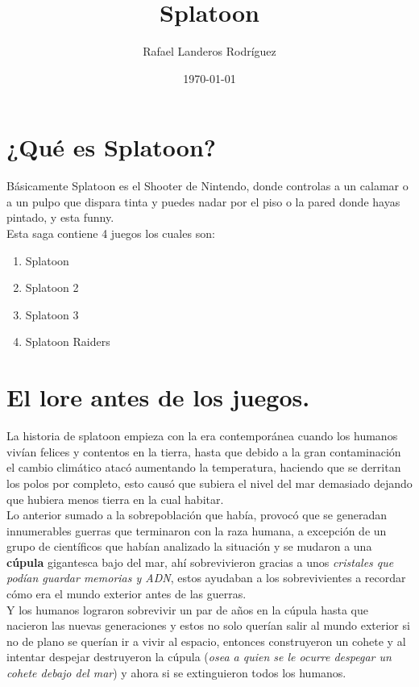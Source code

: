 \documentclass{article}
\title{Splatoon}
\author{Rafael Landeros Rodríguez}
\date{\today}
\begin{document}
\maketitle

\section{¿Qué es Splatoon?}

Básicamente Splatoon es el Shooter de Nintendo, donde controlas a un calamar o a un pulpo que dispara tinta y puedes nadar por el piso o la pared donde hayas pintado, y esta funny.\\

Esta saga contiene 4 juegos los cuales son:

\begin{enumerate}
    \item Splatoon
    \item Splatoon 2
    \item Splatoon 3
    \item Splatoon Raiders
\end{enumerate}

 \section{El lore antes de los juegos.}

La historia de splatoon empieza con la era contemporánea cuando los humanos vivían felices y contentos en la tierra, hasta que debido a la gran contaminación el cambio climático atacó aumentando la temperatura, haciendo que se derritan los polos por completo, esto causó que subiera el nivel del mar demasiado dejando que hubiera menos tierra en la cual habitar. \\

Lo anterior sumado a la sobrepoblación que había, provocó que se generadan innumerables guerras que terminaron con la raza humana, a excepción de un grupo de científicos que habían analizado la situación y se mudaron a una \textbf{cúpula} gigantesca bajo del mar, ahí sobrevivieron gracias a unos \textit{cristales que podían guardar memorias y ADN}, estos ayudaban a los sobrevivientes a recordar cómo era el mundo exterior antes de las guerras.\\

Y los humanos lograron sobrevivir un par de años en la cúpula hasta que nacieron las nuevas generaciones y estos no solo querían salir al mundo exterior si no de plano se querían ir a vivir al espacio, entonces construyeron un cohete y al intentar despejar destruyeron la cúpula (\textit{osea a quien se le ocurre despegar un cohete debajo del mar}) y ahora si se extinguieron todos los humanos.\\
\end{document}
